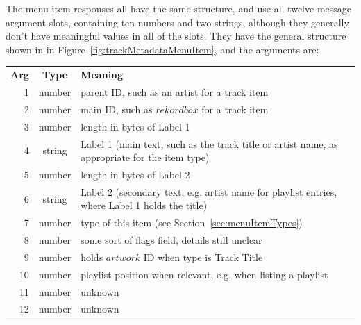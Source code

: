 \documentclass[11pt]{article}
\begin{document}
The menu item responses all have the same structure, and use all
twelve message argument slots, containing ten numbers and two strings,
although they generally don't have meaningful values in all of the
slots. They have the general structure shown in in
Figure~\ref{fig:trackMetadataMenuItem}, and the arguments are:

\begin{center}
  \begin{tabu}{rcX}
    \toprule

    \bfseries{Arg} & \bfseries{Type} & \bfseries{Meaning} \\

    1 & number & parent ID, such as an artist for a track item \\

    2 & number & main ID, such as $rekordbox$ for a track item \\

    3 & number & length in bytes of Label 1 \\

    4 & string & Label 1 (main text, such as the track title or
    artist name, as appropriate for the item type) \\

    5 & number & length in bytes of Label 2 \\

    6 & string & Label 2 (secondary text, e.g. artist name for
    playlist entries, where Label 1 holds the title) \\

    7 & number & type of this item (see
    Section~\ref{sec:menuItemTypes}) \\

    8 & number & some sort of flags field, details still unclear \\

    9 & number & holds $artwork$ ID when type is Track Title \\

    10 & number & playlist position when relevant, e.g. when listing
    a playlist \\

    11 & number & unknown \\

    12 & number & unknown \\

    \bottomrule
  \end{tabu}
\end{center}
\end{document}
